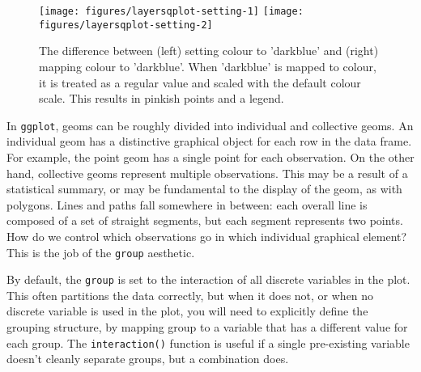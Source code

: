 \begin{Shaded}
\begin{Highlighting}[]
 \NormalTok{(}\NormalTok{))}
 \NormalTok{)}
\end{Highlighting}
\end{Shaded}

\begin{figure}
\texttt{[image: figures/layersqplot-setting-1]} \texttt{[image: figures/layersqplot-setting-2]} \caption{The difference between (left) setting colour to 'darkblue' and (right) mapping colour to 'darkblue'. When 'darkblue' is mapped to colour, it is treated as a regular value and scaled with the default colour scale. This results in pinkish points and a legend.\label{fig:qplot-setting}}
\end{figure}


In \texttt{ggplot}, geoms can be roughly divided into individual and
collective geoms. An individual geom has a distinctive graphical object
for each row in the data frame. For example, the point geom has a single
point for each observation. On the other hand, collective geoms
represent multiple observations. This may be a result of a statistical
summary, or may be fundamental to the display of the geom, as with
polygons. Lines and paths fall somewhere in between: each overall line
is composed of a set of straight segments, but each segment represents
two points. How do we control which observations go in which individual
graphical element? This is the job of the \texttt{group} aesthetic.

By default, the \texttt{group} is set to the interaction of all discrete
variables in the plot. This often partitions the data correctly, but
when it does not, or when no discrete variable is used in the plot, you
will need to explicitly define the grouping structure, by mapping group
to a variable that has a different value for each group. The
\texttt{interaction()} function is useful if a single pre-existing
variable doesn't cleanly separate groups, but a combination does.

